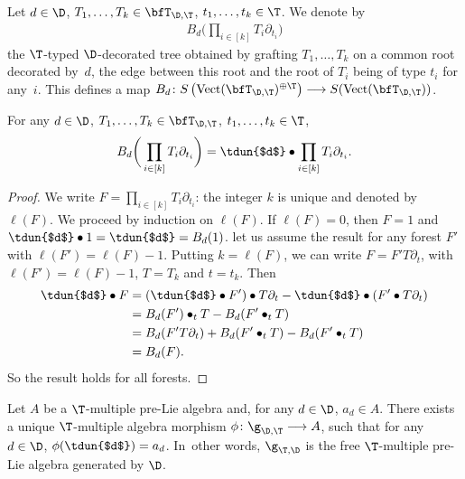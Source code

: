 \begin{Definition}
Let $d\in \D$, $T_1,\dots,T_k\in \bfT_{\D,\T}$, $t_1,\dots,t_k\in \T$. We denote by
\begin{gather*}
B_d\bigg(\prod_{i\in [k]} T_i\partial_{t_i}\bigg)
\end{gather*}
the $\T$-typed $\D$-decorated tree obtained by grafting $T_1,\dots,T_k$ on a common root decorated by~$d$,
the edge between this root and the root of $T_i$ being of type $t_i$ for any~$i$.
This defines a map $B_d\colon S\left(\mathrm{Vect}(\bfT_{\D,\T})^{\oplus \T}\right)\longrightarrow S(\mathrm{Vect}(\bfT_{\D,\T}))$.
\end{Definition}

\begin{Lemma} \label{lemma8}
For any $d\in \D$, $T_1,\dots,T_k\in \bfT_{\D,\T}$, $t_1,\dots,t_k\in \T$,
\begin{gather*}
B_d\bigg(\prod_{i\in [k]} T_i\partial_{t_i}\bigg)=\tdun{$d$}\bullet\prod_{i\in [k]} T_i\partial_{t_i}.
\end{gather*}
\end{Lemma}

\begin{proof} We write $F=\prod_{i\in [k]} T_i\partial_{t_i}$: the integer $k$ is unique
and denoted by $\ell(F)$. We proceed by induction on $\ell(F)$.
If $\ell(F)=0$, then $F=1$ and $\tdun{$d$}\bullet 1=\tdun{$d$}=B_d(1)$.
let us assume the result for any forest $F'$ with $\ell(F')=\ell(F)-1$. Putting $k=\ell(F)$,
we can write $F=F'T\partial_t$, with $\ell(F')=\ell(F)-1$, $T=T_k$ and $t=t_k$. Then
\begin{align*}
\tdun{$d$}\bullet F&=(\tdun{$d$}\bullet F')\bullet T\partial_t-\tdun{$d$}\bullet (F'\bullet T\partial_t)\\
&=B_d(F')\bullet_t T-B_d(F'\bullet_t T)\\
&=B_d(F'T\partial_t)+B_d(F'\bullet_t T)-B_d(F'\bullet_t T)\\
&=B_d(F).
\end{align*}
So the result holds for all forests. \end{proof}

\begin{Corollary} \label{cor9}
Let $A$ be a $\T$-multiple pre-Lie algebra and, for any $d\in \D$, $a_d \in A$.
There exists a unique $\T$-multiple algebra morphism
$\phi\colon \g_{\D,\T}\longrightarrow A$, such that for any $d\in \D$, $\phi(\tdun{$d$})=a_d$.
In~other words, $\g_{\T,\D}$ is the free $\T$-multiple pre-Lie algebra generated by $\D$.
\end{Corollary}

